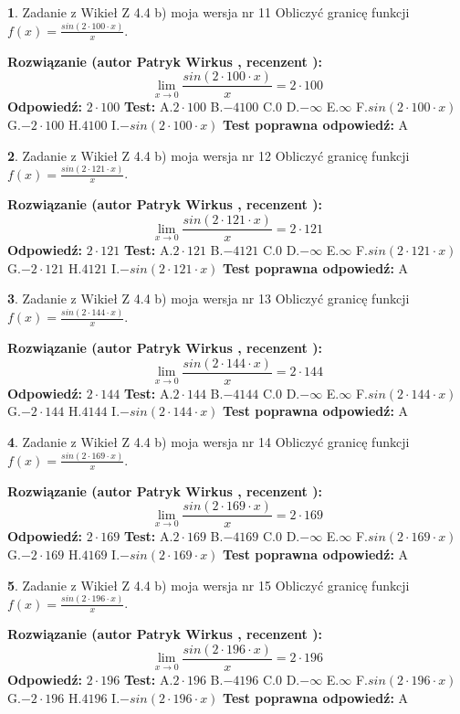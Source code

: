 \documentclass[12pt, a4paper]{article}
\theoremstyle{definition} %
\newtheorem{zad}{}
\newcommand{\zadStart}[1]{\begin{zad}#1\newline}
\newcommand{\zadStop}{\end{zad}}
\newcommand{\rozwStart}[2]{\noindent \textbf{Rozwiązanie (autor #1 , recenzent #2): }\newline}
\newcommand{\rozwStop}{\newline}
\newcommand{\odpStart}{\noindent \textbf{Odpowiedź:}\newline}
\newcommand{\odpStop}{\newline}
\newcommand{\testStart}{\noindent \textbf{Test:}\newline}
\newcommand{\testStop}{\newline}
\newcommand{\kluczStart}{\noindent \textbf{Test poprawna odpowiedź:}\newline}
\newcommand{\kluczStop}{\newline}
\begin{document}
\zadStart{Zadanie z Wikieł Z 4.4 b) moja wersja nr 11}
Obliczyć granicę funkcji $f(x)=\frac{sin(2 \cdot100\cdot x)}{x}$.
\zadStop
\rozwStart{Patryk Wirkus}{}
$$\lim\limits_{x\to 0}\frac{sin(2 \cdot 100\cdot x)}{x}=
2 \cdot 100$$
\rozwStop
\odpStart
$2 \cdot 100$
\odpStop
\testStart
A.$2 \cdot 100$
B.$-4100$
C.$0$
D.$-\infty$
E.$\infty$
F.$sin(2 \cdot 100\cdot x)$
G.$-2 \cdot 100$
H.$4100$
I.$-sin(2 \cdot 100\cdot x)$
\testStop
\kluczStart
A
\kluczStop



\zadStart{Zadanie z Wikieł Z 4.4 b) moja wersja nr 12}
Obliczyć granicę funkcji $f(x)=\frac{sin(2 \cdot121\cdot x)}{x}$.
\zadStop
\rozwStart{Patryk Wirkus}{}
$$\lim\limits_{x\to 0}\frac{sin(2 \cdot 121\cdot x)}{x}=
2 \cdot 121$$
\rozwStop
\odpStart
$2 \cdot 121$
\odpStop
\testStart
A.$2 \cdot 121$
B.$-4121$
C.$0$
D.$-\infty$
E.$\infty$
F.$sin(2 \cdot 121\cdot x)$
G.$-2 \cdot 121$
H.$4121$
I.$-sin(2 \cdot 121\cdot x)$
\testStop
\kluczStart
A
\kluczStop



\zadStart{Zadanie z Wikieł Z 4.4 b) moja wersja nr 13}
Obliczyć granicę funkcji $f(x)=\frac{sin(2 \cdot144\cdot x)}{x}$.
\zadStop
\rozwStart{Patryk Wirkus}{}
$$\lim\limits_{x\to 0}\frac{sin(2 \cdot 144\cdot x)}{x}=
2 \cdot 144$$
\rozwStop
\odpStart
$2 \cdot 144$
\odpStop
\testStart
A.$2 \cdot 144$
B.$-4144$
C.$0$
D.$-\infty$
E.$\infty$
F.$sin(2 \cdot 144\cdot x)$
G.$-2 \cdot 144$
H.$4144$
I.$-sin(2 \cdot 144\cdot x)$
\testStop
\kluczStart
A
\kluczStop



\zadStart{Zadanie z Wikieł Z 4.4 b) moja wersja nr 14}
Obliczyć granicę funkcji $f(x)=\frac{sin(2 \cdot169\cdot x)}{x}$.
\zadStop
\rozwStart{Patryk Wirkus}{}
$$\lim\limits_{x\to 0}\frac{sin(2 \cdot 169\cdot x)}{x}=
2 \cdot 169$$
\rozwStop
\odpStart
$2 \cdot 169$
\odpStop
\testStart
A.$2 \cdot 169$
B.$-4169$
C.$0$
D.$-\infty$
E.$\infty$
F.$sin(2 \cdot 169\cdot x)$
G.$-2 \cdot 169$
H.$4169$
I.$-sin(2 \cdot 169\cdot x)$
\testStop
\kluczStart
A
\kluczStop



\zadStart{Zadanie z Wikieł Z 4.4 b) moja wersja nr 15}
Obliczyć granicę funkcji $f(x)=\frac{sin(2 \cdot196\cdot x)}{x}$.
\zadStop
\rozwStart{Patryk Wirkus}{}
$$\lim\limits_{x\to 0}\frac{sin(2 \cdot 196\cdot x)}{x}=
2 \cdot 196$$
\rozwStop
\odpStart
$2 \cdot 196$
\odpStop
\testStart
A.$2 \cdot 196$
B.$-4196$
C.$0$
D.$-\infty$
E.$\infty$
F.$sin(2 \cdot 196\cdot x)$
G.$-2 \cdot 196$
H.$4196$
I.$-sin(2 \cdot 196\cdot x)$
\testStop
\kluczStart
A
\kluczStop
\end{document}
